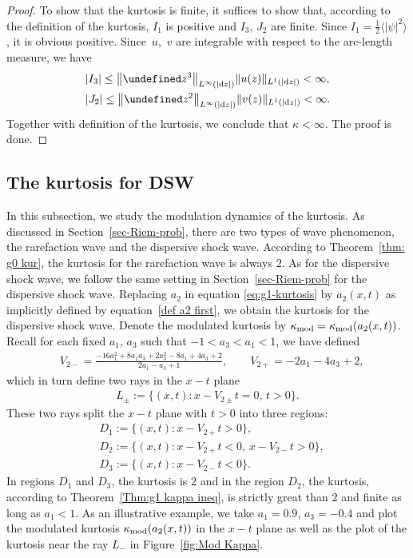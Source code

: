 \documentclass[10pt,a4paper]{amsart}
\numberwithin{equation}{section}
\let\Im\undefined
\DeclareMathOperator{\Im}{Im}
\begin{document}
\begin{proof}
To show that the kurtosis is finite, it suffices to show that, according to the definition of the kurtosis, $I_1$ is positive and $I_3$, $J_2$ are finite. Since $I_1=\frac{1}{2}\bigl\langle|\psi|^2\bigr\rangle$, it is obvious positive. Since~$u$,~$v$ are integrable with respect to the arc-length measure, we have
\begin{align*}
&|I_3|\leq \bigl\|\Im z^3\bigr\|_{L^\infty(|{\rm d}z|)}\|u(z)\|_{L^1(|{\rm d}z|)}<\infty,\\
&|J_2|\leq \bigl\|\Im z^2\bigr\|_{L^\infty(|{\rm d}z|)}\|v(z)\|_{L^1(|{\rm d}z|)}<\infty.
\end{align*}
Together with definition of the kurtosis, we conclude that $\kappa<\infty$. The proof is done.
\end{proof}

\subsection{The kurtosis for DSW}

In this subsection, we study the modulation dynamics of the kurtosis. As discussed in Section~\ref{sec-Riem-prob},
there are two types of wave phenomenon, the rarefaction wave and the dispersive shock wave. According to Theorem~\ref{thm: g0 kur}, the kurtosis for the rarefaction wave is always $2$. As for the dispersive shock wave, we follow the same setting in Section~\ref{sec-Riem-prob} for the dispersive shock wave. Replacing $a_2$ in equation \eqref{eq:g1-kurtosis} by $a_2(x,t)$ as implicitly defined by equation~\eqref{def a2 first}, we obtain the kurtosis for the dispersive shock wave. Denote the modulated kurtosis by $\kappa_{\rm mod}=\kappa_{\rm mod}(a_2(x,t))$. Recall for each fixed $a_1$, $a_3$ such that $-1<a_3<a_1<1$, we have defined
\begin{align*}
&V_{2-}=\frac{-16a_1^2+8a_1a_3+2a_3^2-8a_1+4a_3+2}{2a_1-a_3+1},\qquad V_{2+}=-2a_1-4a_3+2,
\end{align*}
which in turn define two rays in the $x-t$ plane
\begin{align*}
L_{\pm}:=\{(x,t)\colon x-V_{2\pm}t=0,\,t>0\}.
\end{align*}
These two rays split the $x-t$ plane with $t>0$ into three regions:
\begin{align*}
&D_1:=\{(x,t)\colon x-V_{2+}t>0\},\\
&D_2:=\{(x,t)\colon x-V_{2+}t<0,\, x-V_{2-}t>0\},\\
&D_3:=\{(x,t)\colon x-V_{2-}t<0\}.
\end{align*}
In regions $D_1$ and $D_3$, the kurtosis is $2$ and in the region $D_2$, the kurtosis, according to Theorem~\ref{Thm:g1 kappa ineq}, is strictly great than $2$ and finite as long as $a_1<1$. As an illustrative example, we take $a_1=0.9$, $a_3=-0.4$ and plot the modulated kurtosis $\kappa_{\rm mod}(a_2(x,t))$ in the $x-t$ plane as well as the plot of the kurtosis near the ray $L_-$ in Figure~\ref{fig:Mod Kappa}.
\end{document}
